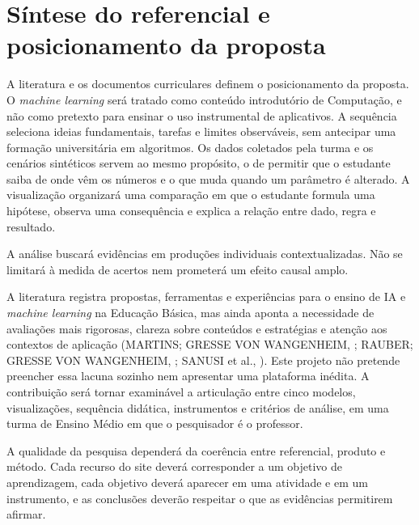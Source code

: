 \section{Síntese do referencial e posicionamento da proposta}

A literatura e os documentos curriculares definem o posicionamento da proposta. O \textit{machine learning} será tratado como conteúdo introdutório de Computação, e não como pretexto para ensinar o uso instrumental de aplicativos. A sequência seleciona ideias fundamentais, tarefas e limites observáveis, sem antecipar uma formação universitária em algoritmos. Os dados coletados pela turma e os cenários sintéticos servem ao mesmo propósito, o de permitir que o estudante saiba de onde vêm os números e o que muda quando um parâmetro é alterado. A visualização organizará uma comparação em que o estudante formula uma hipótese, observa uma consequência e explica a relação entre dado, regra e resultado.

A análise buscará evidências em produções individuais contextualizadas. Não se limitará à medida de acertos nem prometerá um efeito causal amplo.

A literatura registra propostas, ferramentas e experiências para o ensino de IA e \textit{machine learning} na Educação Básica, mas ainda aponta a necessidade de avaliações mais rigorosas, clareza sobre conteúdos e estratégias e atenção aos contextos de aplicação (\MakeUppercase{MARTINS; GRESSE VON WANGENHEIM}, \citeyear{martins2023findings}; \MakeUppercase{RAUBER; GRESSE VON WANGENHEIM}, \citeyear{rauber2023assessing}; \MakeUppercase{SANUSI} et al., \citeyear{sanusi2023systematic}). Este projeto não pretende preencher essa lacuna sozinho nem apresentar uma plataforma inédita. A contribuição será tornar examinável a articulação entre cinco modelos, visualizações, sequência didática, instrumentos e critérios de análise, em uma turma de Ensino Médio em que o pesquisador é o professor.

A qualidade da pesquisa dependerá da coerência entre referencial, produto e método. Cada recurso do site deverá corresponder a um objetivo de aprendizagem, cada objetivo deverá aparecer em uma atividade e em um instrumento, e as conclusões deverão respeitar o que as evidências permitirem afirmar.
